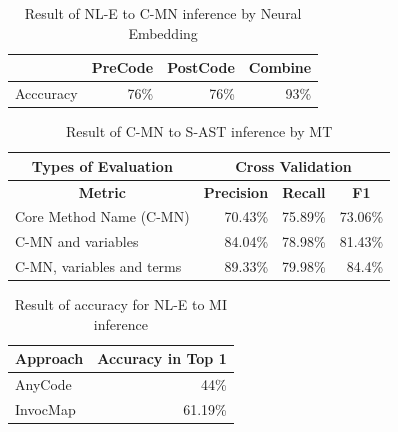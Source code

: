 \documentclass[sigconf,review,anonymous]{article}
\begin{document}
\begin{table}[]
\caption{Result of NL-E to C-MN inference by Neural Embedding}
\label{tbl:Q2Result}
\centering
\begin{tabular}{|l|l|l|l|}
\hline
\textbf{} & \textbf{PreCode}          & \textbf{PostCode}         & \textbf{Combine}          \\ \hline
Acccuracy & \multicolumn{1}{r|}{76\%} & \multicolumn{1}{r|}{76\%} & \multicolumn{1}{r|}{93\%} \\ \hline
\end{tabular}
\end{table}



\begin{table}[]

\caption{Result of C-MN to S-AST inference by MT}
\label{tbl:Q3Result}

\centering
\begin{tabular}{|l|r|r|r|}
\hline
\multicolumn{1}{|c|}{\textbf{Types of Evaluation}} & \multicolumn{3}{c|}{\textbf{Cross Validation}}                                                                                             \\ \hline
\multicolumn{1}{|c|}{\textbf{Metric}}              & \multicolumn{1}{c|}{\textbf{Precision}} & \multicolumn{1}{c|}{\textbf{Recall}} & \multicolumn{1}{c|}{\textbf{F1}}  \\ \hline
Core Method Name (C-MN)                            & 70.43\%                                   & 75.89\%                                & 73.06\%                                                        \\ \hline
C-MN and variables                                 & 84.04\%                                   & 78.98\%                                & 81.43\%                                                      \\ \hline
C-MN, variables and terms                          & 89.33\%                                   & 79.98\%                                & 84.4\%                                                            \\ \hline
\end{tabular}
\end{table}


\begin{table}[]
\caption{Result of accuracy for NL-E to MI inference}
\label{tbl:Q4ResultAccuracy}
\centering
\begin{tabular}{|l|r|}
\hline
\multicolumn{1}{|c|}{\textbf{Approach}} & \multicolumn{1}{c|}{\textbf{Accuracy in Top 1}} \\ \hline
AnyCode                                 & 44\%                                            \\ \hline
InvocMap                                & 61.19\%                                         \\ \hline
\end{tabular}
\end{table}
\end{document}
